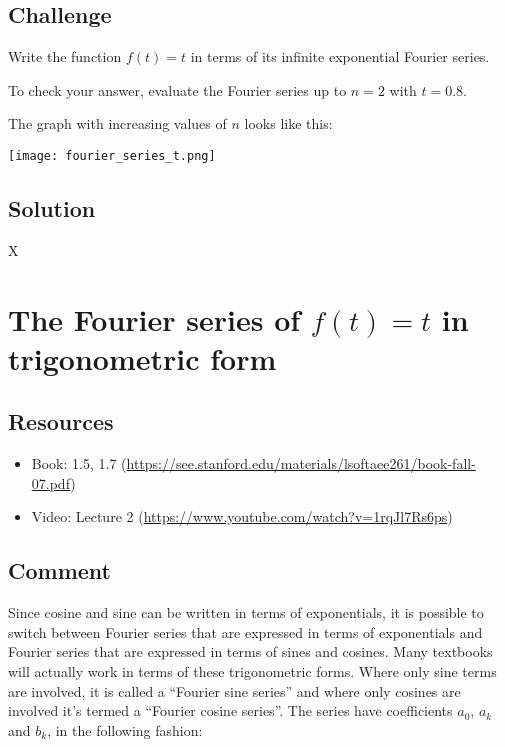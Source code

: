 \subsection*{Challenge}
Write the function $f(t)=t$ in terms of its infinite exponential Fourier series.

To check your answer, evaluate the Fourier series up to $n=2$ with $t=0.8$.

The graph with increasing values of $n$ looks like this:

\texttt{[image: fourier\_series\_t.png]}

\subsection*{Solution}
X


\timebox




\newpage

\section{The Fourier series of $f(t)=t$ in trigonometric form}
\label{sec:trigexpconvert}

\subsection*{Resources}
\begin{itemize}
    \item Book: 1.5, 1.7 (\url{https://see.stanford.edu/materials/lsoftaee261/book-fall-07.pdf})
    \item Video: Lecture 2 (\url{https://www.youtube.com/watch?v=1rqJl7Rs6ps})
\end{itemize}

\subsection*{Comment}
Since cosine and sine can be written in terms of exponentials, it is possible to switch between Fourier series that are expressed in terms of exponentials and Fourier series that are expressed in terms of sines and cosines. Many textbooks will actually work in terms of these trigonometric forms. Where only sine terms are involved, it is called a ``Fourier sine series'' and where only cosines are involved it's termed a ``Fourier cosine series''. The series have coefficients $a_0$, $a_k$ and $b_k$, in the following fashion:

